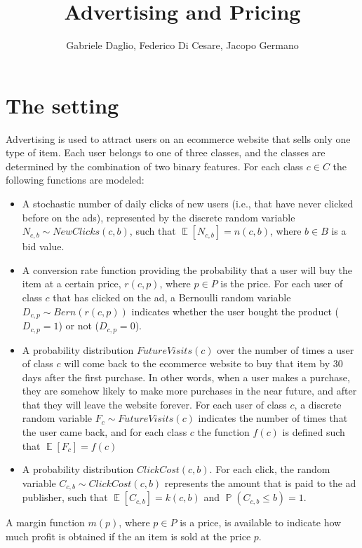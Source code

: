 \documentclass[11pt]{article} %
\title{Advertising and Pricing}
\author{Gabriele Daglio, Federico Di Cesare, Jacopo Germano}
\DeclareMathOperator{\EX}{\mathbb{E}}
\DeclareMathOperator{\Prob}{\mathbb{P}}
\begin{document}
\maketitle

\section{The setting}

Advertising is used to attract users on an ecommerce website that sells only one type of item. Each user belongs to one of three classes, and the classes are determined by the combination of two binary features. For each class $c \in C$ the following functions are modeled:
\begin{itemize}
\item A stochastic number of daily clicks of new users (i.e., that have never clicked before on the ads), represented by the discrete random variable $N_{c,b}\sim NewClicks(c,b)$, such that $\EX[N_{c,b}]=n(c,b)$, where $b \in B$ is a bid value. 
\item A conversion rate function providing the probability that a user will buy the item at a certain price,  $r(c,p)$, where $p \in P$ is the price. For each user of class $c$ that has clicked on the ad, a Bernoulli random variable $D_{c,p} \sim Bern(r(c,p))$ indicates whether the user bought the product ($D_{c,p}=1$) or not ($D_{c,p}=0$).
\item A probability distribution $FutureVisits(c)$ over the number of times a user of class $c$ will come back to the ecommerce website to buy that item by 30 days after the first purchase. In other words, when a user makes a purchase, they are somehow likely to make more purchases in the near future, and after that they will leave the website forever. For each user of class $c$, a discrete random variable $F_c \sim FutureVisits(c)$ indicates the number of times that the user came back, and for each class $c$ the function $f(c)$ is defined such that $\EX[F_c] = f(c)$
\item A probability distribution $ClickCost(c,b)$. For each click, the random variable $C_{c,b}\sim ClickCost(c,b)$ represents the amount that is paid to the ad publisher, such that $\EX[C_{c,b}] = k(c,b)$ and $\Prob(C_{c,b} \leq b) = 1$.
\end{itemize}

A margin function $m(p)$, where $p \in P$ is a price, is available to indicate how much profit is obtained if the an item is sold at the price $p$. 
\end{document}
